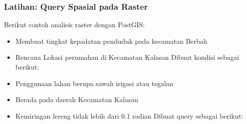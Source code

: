 \documentclass[letterpaper,10pt,english]{sphinxmanual}
\begin{document}
\subsubsection{Latihan: Query Spasial pada Raster}
\label{\detokenize{sesi2/postgisquery:latihan-query-spasial-pada-raster}}
Berikut contoh analisis raster dengan PostGIS:
\begin{itemize}
\item {} 
Membuat tingkat kepadatan penduduk pada kecamatan Berbah

\end{itemize}

\begin{sphinxVerbatim}[commandchars=\\\{\}]
        
    
  
	      
          
	            
       
  
\end{sphinxVerbatim}

\begin{itemize}
\item {} 
Rencana Lokasi perumahan di Kecamatan Kalasan
Dibuat kondisi sebagai berikut:

\end{itemize}
\begin{itemize}
\item {} 
Penggunaan lahan berupa sawah irigasi atau tegalan

\item {} 
Berada pada daerah Kecamatan Kalasan

\item {} 
Kemiringan lereng tidak lebih dari 0.1 radian
Dibuat query sebagai berikut:

\end{itemize}
\end{document}
